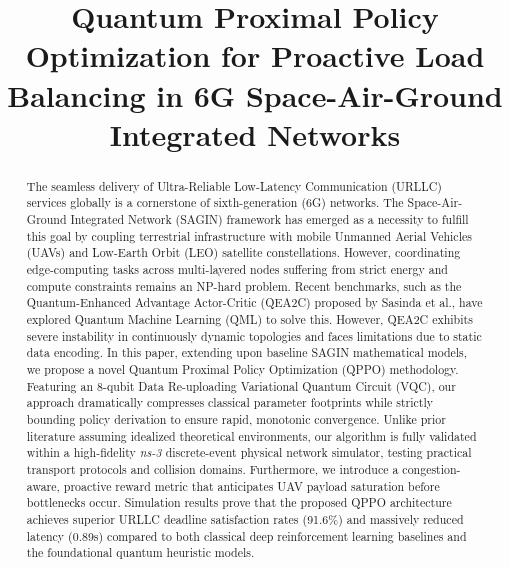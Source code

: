 \documentclass[conference]{IEEEtran}
\begin{document}
\title{Quantum Proximal Policy Optimization for Proactive Load Balancing in 6G Space-Air-Ground Integrated Networks}

\author{
}

\maketitle

\begin{abstract}
The seamless delivery of Ultra-Reliable Low-Latency Communication (URLLC) services globally is a cornerstone of sixth-generation (6G) networks. The Space-Air-Ground Integrated Network (SAGIN) framework has emerged as a necessity to fulfill this goal by coupling terrestrial infrastructure with mobile Unmanned Aerial Vehicles (UAVs) and Low-Earth Orbit (LEO) satellite constellations. However, coordinating edge-computing tasks across multi-layered nodes suffering from strict energy and compute constraints remains an NP-hard problem. Recent benchmarks, such as the Quantum-Enhanced Advantage Actor-Critic (QEA2C) proposed by Sasinda et al., have explored Quantum Machine Learning (QML) to solve this. However, QEA2C exhibits severe instability in continuously dynamic topologies and faces limitations due to static data encoding. In this paper, extending upon baseline SAGIN mathematical models, we propose a novel Quantum Proximal Policy Optimization (QPPO) methodology. Featuring an 8-qubit Data Re-uploading Variational Quantum Circuit (VQC), our approach dramatically compresses classical parameter footprints while strictly bounding policy derivation to ensure rapid, monotonic convergence. Unlike prior literature assuming idealized theoretical environments, our algorithm is fully validated within a high-fidelity \textit{ns-3} discrete-event physical network simulator, testing practical transport protocols and collision domains. Furthermore, we introduce a congestion-aware, proactive reward metric that anticipates UAV payload saturation before bottlenecks occur. Simulation results prove that the proposed QPPO architecture achieves superior URLLC deadline satisfaction rates (91.6\%) and massively reduced latency (0.89s) compared to both classical deep reinforcement learning baselines and the foundational quantum heuristic models.
\end{abstract}
\end{document}
